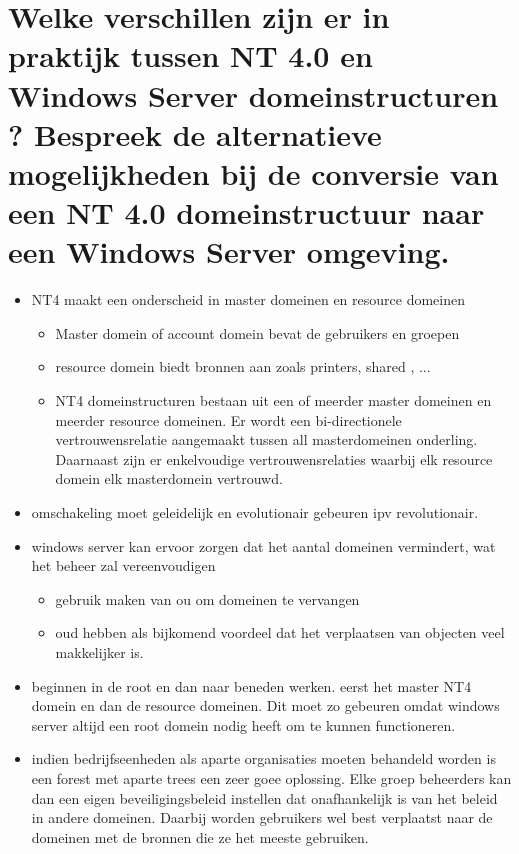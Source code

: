 \section{Welke verschillen zijn er in praktijk tussen NT 4.0 en Windows Server domeinstructuren ? Bespreek de alternatieve mogelijkheden bij de conversie van een NT 4.0 domeinstructuur naar een Windows Server omgeving.}
\begin{itemize}
\item NT4 maakt een onderscheid in master domeinen en resource domeinen
\begin{itemize}
\item Master domein of account domein bevat de gebruikers en groepen 
\item resource domein biedt bronnen aan zoals printers, shared , ...
\item NT4 domeinstructuren bestaan uit een of meerder master domeinen en meerder resource domeinen. Er wordt een bi-directionele vertrouwensrelatie aangemaakt tussen all masterdomeinen onderling. Daarnaast zijn er enkelvoudige vertrouwensrelaties waarbij elk resource domein elk masterdomein vertrouwd.
\end{itemize}
\item omschakeling moet geleidelijk en evolutionair gebeuren ipv revolutionair.

\item windows server kan ervoor zorgen dat het aantal domeinen vermindert, wat het beheer zal vereenvoudigen
\begin{itemize}
\item gebruik maken van ou om domeinen te vervangen
\item oud hebben als bijkomend voordeel dat het verplaatsen van objecten veel makkelijker is.
\end{itemize}

\item beginnen in de root en dan naar beneden werken. eerst het master NT4 domein en dan de resource domeinen. Dit moet zo gebeuren omdat windows server altijd een root domein nodig heeft om te kunnen functioneren.

\item indien bedrijfseenheden als aparte organisaties moeten behandeld worden is een forest met aparte trees een zeer goee oplossing. Elke groep beheerders kan dan een eigen beveiligingsbeleid instellen dat onafhankelijk is van het beleid in andere domeinen. Daarbij worden gebruikers wel best verplaatst naar de domeinen met de bronnen die ze het meeste gebruiken.



\end{itemize}
